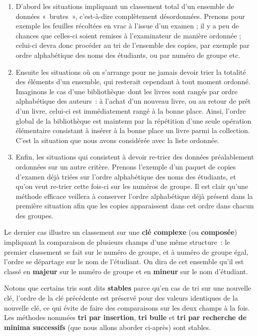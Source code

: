 	\liststyleWWviiiNumi
	\begin{enumerate}
		\item 
			D’abord les situations impliquant un classement total d’un ensemble de
			données «~bru\-tes~», c’est-à-dire complètement désordonnées. Prenons
			pour exemple les feuilles récoltées en vrac à l’issue d’un examen ; il
			y a peu de chances que celles-ci soient remises à l’examinateur de
			manière ordonnée ; celui-ci devra donc procéder au tri de l’ensemble
			des copies, par exemple par ordre alphabétique des noms des étudiants,
			ou par numéro de groupe etc.
		\item 
			Ensuite les situations où on s’arrange pour ne jamais devoir trier la
			totalité des éléments d’un ensemble, qui resterait cependant à tout
			moment ordonné. Imaginons le cas d’une bibliothèque~dont les livres
			sont rangés par ordre alphabétique des auteurs~: à l’achat d’un nouveau
			livre, ou au retour de prêt d’un livre, celui-ci est immédiatement
			rangé à la bonne place. Ainsi, l’ordre global de la bibliothèque est
			maintenu par la répétition d’une seule opération élémentaire consistant
			à insérer à la bonne place un livre parmi la collection. C’est la
			situation que nous avons considérée avec la liste ordonnée.
		\item 
			Enfin, les situations qui consistent à devoir re-trier des données
			préalablement ordonnées sur un autre critère. Prenons l’exemple d’un
			paquet de copies d’examen déjà triées sur l’ordre alphabétique des noms
			des étudiants, et qu’on veut re-trier cette fois-ci sur les numéros de
			groupe. Il est clair qu’une méthode efficace veillera à conserver
			l’ordre alphabétique déjà présent dans la première situation afin que
			les copies apparaissent dans cet ordre dans chacun des groupes.
	\end{enumerate}
	
	Le dernier cas illustre un classement sur une \textbf{clé complexe}
	(ou \textbf{composée}) impliquant la comparaison de plusieurs champs
	d’une même structure~: le premier classement se fait sur le numéro de
	groupe, et à numéro de groupe égal, l’ordre se départage sur le nom de
	l’étudiant. On dira de cet ensemble qu’il est classé en \textbf{majeur}
	sur le numéro de groupe et en \textbf{mineur} sur le nom d’étudiant.

	Notons que certains tris sont dits \textbf{stables} parce
	qu'en cas de tri sur une nouvelle clé, l’ordre de la
	clé précédente est préservé pour des valeurs identiques de la nouvelle
	clé, ce qui évite de faire des comparaisons sur les deux champs à la
	fois. Les méthodes nommées \textbf{tri par insertion}, \textbf{tri
	bulle} et \textbf{tri par recherche de minima successifs }(que nous
	allons aborder ci-après) sont stables.

